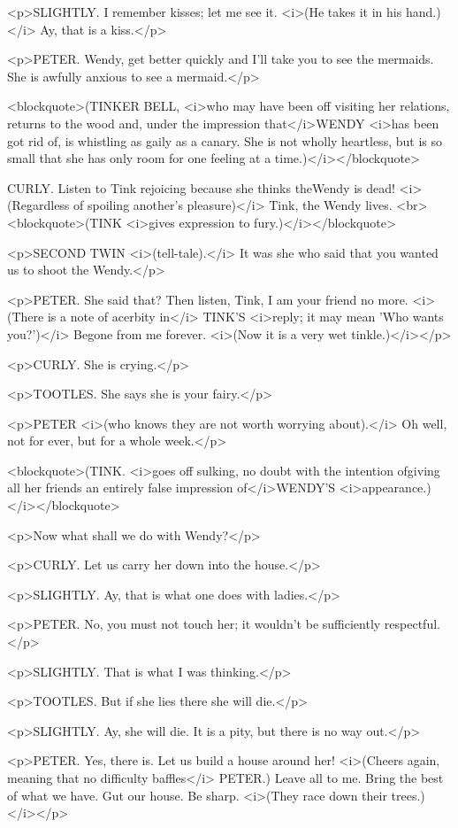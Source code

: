 <p>SLIGHTLY. I remember kisses; let me see it. <i>(He takes it in his hand.)</i> Ay, that is a kiss.</p>

<p>PETER. Wendy, get better quickly and I'll take you to see the mermaids. She is awfully anxious to see a mermaid.</p>

<blockquote>(TINKER BELL, <i>who may have been off visiting her relations, returns to the wood and, under the impression that</i>WENDY <i>has been got rid of, is whistling as gaily as a canary. She is not wholly heartless, but is so small that she has only room for one feeling at a time.)</i></blockquote>

CURLY. Listen to Tink rejoicing because she thinks theWendy is dead! <i>(Regardless of spoiling another's pleasure)</i> Tink, the Wendy lives. <br> <blockquote>(TINK <i>gives expression to fury.)</i></blockquote>

<p>SECOND TWIN <i>(tell-tale).</i> It was she who said that you wanted us to shoot the Wendy.</p>

<p>PETER. She said that? Then listen, Tink, I am your friend no more. <i>(There is a note of acerbity in</i> TINK'S <i>reply; it may mean 'Who wants you?')</i> Begone from me forever. <i>(Now it is a very wet tinkle.)</i></p>

<p>CURLY. She is crying.</p>

<p>TOOTLES. She says she is your fairy.</p>

<p>PETER <i>(who knows they are not worth worrying about).</i> Oh well, not for ever, but for a whole week.</p>

<blockquote>(TINK. <i>goes off sulking, no doubt with the intention ofgiving all her friends an entirely false impression of</i>WENDY'S <i>appearance.)</i></blockquote>

<p>Now what shall we do with Wendy?</p>

<p>CURLY. Let us carry her down into the house.</p>

<p>SLIGHTLY. Ay, that is what one does with ladies.</p>

<p>PETER. No, you must not touch her; it wouldn't be sufficiently respectful.</p>

<p>SLIGHTLY. That is what I was thinking.</p>

<p>TOOTLES. But if she lies there she will die.</p>

<p>SLIGHTLY. Ay, she will die. It is a pity, but there is no way out.</p>

<p>PETER. Yes, there is. Let us build a house around her! <i>(Cheers again, meaning that no difficulty baffles</i> PETER.) Leave all to me. Bring the best of what we have. Gut our house. Be sharp. <i>(They race down their trees.)</i></p>

